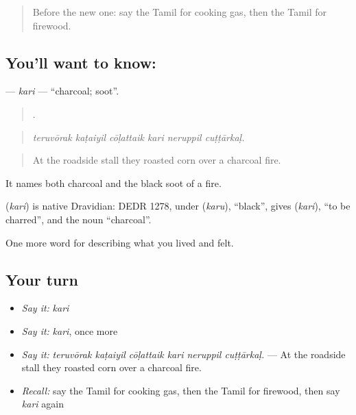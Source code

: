 \label{lesson:TA-C525-kari}



\begin{quote}
Before the new one: say the Tamil for cooking gas, then the Tamil for firewood.
\end{quote}

\subsection*{You'll want to know: }
\textbf{} — \emph{kari} — \textquotedblleft{}charcoal; soot\textquotedblright{}.

\begin{quote}
     .
\end{quote}

\begin{quote}
\emph{teruvōrak kaṭaiyil cōḷattaik kari neruppil cuṭṭārkaḷ.}
\end{quote}

\begin{quote}
At the roadside stall they roasted corn over a charcoal fire.
\end{quote}

It names both charcoal and the black soot of a fire.

\begin{cousinweb}
\textbf{} (\emph{kari}) is native Dravidian: DEDR 1278, under  (\emph{karu}), \textquotedblleft{}black\textquotedblright{}, gives  (\emph{kari}), \textquotedblleft{}to be charred\textquotedblright{}, and the noun \textquotedblleft{}charcoal\textquotedblright{}.
\end{cousinweb}

\begin{grammarlens}[title={What you've built}]
One more word for describing what you lived and felt.
\end{grammarlens}

\subsection*{Your turn}
\begin{itemize}
\raggedright
  \item \emph{Say it:} \emph{kari}
  \item \emph{Say it:} \emph{kari}, once more
  \item \emph{Say it:} \emph{teruvōrak kaṭaiyil cōḷattaik kari neruppil cuṭṭārkaḷ.} — At the roadside stall they roasted corn over a charcoal fire.
  \item \emph{Recall:} say the Tamil for cooking gas, then the Tamil for firewood, then say \emph{kari} again
\end{itemize}


